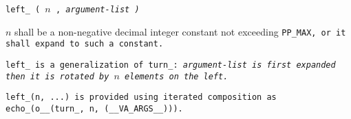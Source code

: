 
\tt{left_ (} $n$ \tt{,} \it{argument-list} \tt{)}


$n$ shall be a non-negative decimal integer constant not exceeding \tt{PP_MAX},
or it shall expand to such a constant.


\tt{left_} is a generalization of \tt{turn_}: \it{argument-list}
is first expanded then it is rotated by $n$ elements on the left.

\note \tt{left_(n, ...)} is provided using iterated
composition as \tt{echo_(o__(turn_, n, (__VA_ARGS__)))}.
